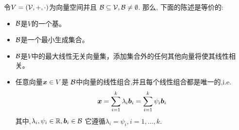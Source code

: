 令$V = (\mathcal{V},+,\cdot)$为向量空间并且
$\mathcal{B} \subseteq \mathcal{V}, \mathcal{B} \neq \emptyset$.
那么, 下面的陈述是等价的:
\begin{itemize}
    \item $\mathcal{B}$是$V$的一个基。
    \item $\mathcal{B}$是一个最小生成集合。
    \item $\mathcal{B}$是$V$中的最大线性无关向量集，添加集合外的任何其他向量将使其线性相关。
    \item 任意向量$\boldsymbol{x} \in V$是
          $\mathcal{B}$中向量的线性组合,并且每个线性组合都是唯一的,i.e.
    \begin{equation}
        \boldsymbol{x} =
        \sum_{i=1}^{k}\lambda_i\boldsymbol{b}_i =
        \sum_{i=1}^{k}\psi_i\boldsymbol{b}_i
    \end{equation}
    其中,$\lambda_i, \psi_i \in \mathbb{R},\boldsymbol{b}_i \in \mathcal{B}$
    它遵循$\lambda_i = \psi_i, i = 1,\dots,k$.
\end{itemize}

